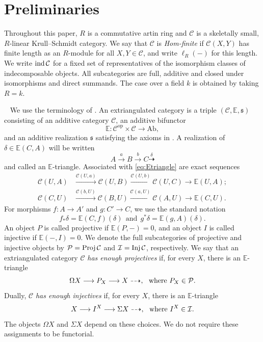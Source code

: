 \documentclass[11pt, twoside]{article}
\def\C{\mathcal{C}}
\def\E{\mathbb{E}}
\numberwithin{equation}{section}
\begin{document}
\section{Preliminaries}\label{sec:prelim}

Throughout this paper, $R$ is a commutative artin ring and $\C$ is a
skeletally small, $R$-linear Krull--Schmidt category.  We say that $\C$ is
\emph{Hom-finite} if $\C(X,Y)$ has finite length as an $R$-module for all
$X,Y\in\C$, and write $\ell_R(-)$ for this length.  We write $\ind\C$ for a
fixed set of representatives of the isomorphism classes of indecomposable
objects.  All subcategories are full, additive and closed under isomorphisms
and direct summands.  The case over a field $k$ is obtained by taking
$R=k$.

\vspace{2mm}

\hspace{-5mm}{\bf 2.1 Extriangulated categories.}~
We use the terminology of \cite{NakaokaPalu2019}.  An extriangulated category
is a triple $(\C,\E,\mathfrak s)$ consisting of an additive category $\C$, an
additive bifunctor
\[
 \E\colon \C^{\mathrm{op}}\times\C\longrightarrow\mathrm{Ab},
\]
and an additive realization $\mathfrak s$ satisfying the axioms in
\cite[Definition~2.12]{NakaokaPalu2019}.  A realization of
$\delta\in\E(C,A)$ will be written
\begin{equation}\label{eq:Etriangle}
 A\xrightarrow{a}B\xrightarrow{b}C\overset{\delta}{\dashrightarrow}
\end{equation}
and called an $\E$-triangle.  Associated with \eqref{eq:Etriangle} are exact
sequences
\begin{align*}
 \C(U,A)&\xrightarrow{\C(U,a)}\C(U,B)
 \xrightarrow{\C(U,b)}\C(U,C)\longrightarrow\E(U,A);\\
 \C(C,U)&\xrightarrow{\C(b,U)}\C(B,U)
 \xrightarrow{\C(a,U)}\C(A,U)\longrightarrow\E(C,U).
\end{align*}
For morphisms $f\colon A\to A'$ and $g\colon C'\to C$, we use the standard notation
\[
 f_*\delta=\E(C,f)(\delta)~~\mbox{and}~~g^*\delta=\E(g,A)(\delta).
\]
An object $P$ is called projective if $\E(P,-)=0$, and an object $I$ is called injective if $\E(-,I)=0$.  We denote the full subcategories of projective and injective objects by $\Pcal=\Proj\C$ and $\Ical=\Inj\C$, respectively.
We say that an extriangulated category $\C$ \emph{has enough projectives} if, for every $X$, there is an $\E$-triangle
$$
 \Omega X\longrightarrow P_X\longrightarrow X\dashrightarrow,
 ~~\mbox{where}~P_X\in\mathcal{P}.
$$
Dually, $\C$ \emph{has enough injectives} if, for every $X$, there is an $\E$-triangle
$$
 X\longrightarrow I^X\longrightarrow\Sigma X\dashrightarrow,
 ~~\mbox{where}~ I^X\in\mathcal{I}.
$$
The objects $\Omega X$ and $\Sigma X$ depend on these choices.
We do not require these assignments to be functorial.
\end{document}
